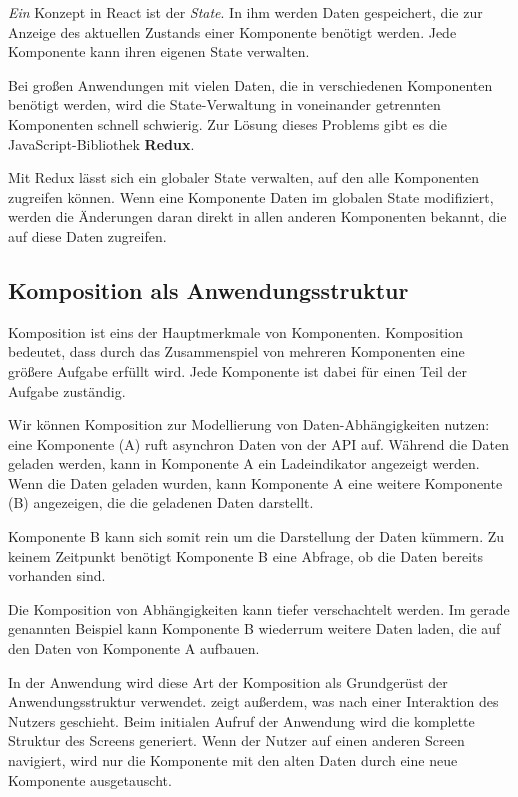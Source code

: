 \emph{Ein} Konzept in React ist der \emph{State}. In ihm werden Daten gespeichert, die zur Anzeige des aktuellen Zustands einer Komponente benötigt werden. Jede Komponente kann ihren eigenen State verwalten. \citep[State and Lifecycle]{ReactDocs}

Bei großen Anwendungen mit vielen Daten, die in verschiedenen Komponenten benötigt werden, wird die State-Verwaltung in voneinander getrennten Komponenten schnell schwierig. Zur Lösung dieses Problems gibt es die JavaScript-Bibliothek \textbf{Redux}.

Mit Redux lässt sich ein globaler State verwalten, auf den alle Komponenten zugreifen können. Wenn eine Komponente Daten im globalen State modifiziert, werden die Änderungen daran direkt in allen anderen Komponenten bekannt, die auf diese Daten zugreifen.

\subsection{Komposition als An\-wen\-dungs\-struk\-tur}
\label{subsec:komposition}

Komposition ist eins der Hauptmerkmale von Komponenten. Komposition bedeutet, dass durch das Zusammenspiel von mehreren Komponenten eine größere Aufgabe erfüllt wird. Jede Komponente ist dabei für einen Teil der Aufgabe zuständig. \citep[Kapitel 1]{Maemecke2017}

Wir können Komposition zur Modellierung von Daten-Abhängigkeiten nutzen: eine Komponente (A) ruft asynchron Daten von der \ac{API} auf. Während die Daten geladen werden, kann in Komponente A ein Ladeindikator angezeigt werden. Wenn die Daten geladen wurden, kann Komponente A eine weitere Komponente (B) angezeigen, die die geladenen Daten darstellt.

Komponente B kann sich somit rein um die Darstellung der Daten kümmern. Zu keinem Zeitpunkt benötigt Komponente B eine Abfrage, ob die Daten bereits vorhanden sind.

Die Komposition von Abhängigkeiten kann tiefer verschachtelt werden. Im gerade genannten Beispiel kann Komponente B wiederrum weitere Daten laden, die auf den Daten von Komponente A aufbauen.

In der Anwendung wird diese Art der Komposition als Grundgerüst der Anwendungsstruktur verwendet.  zeigt außerdem, was nach einer Interaktion des Nutzers geschieht. Beim initialen Aufruf der Anwendung wird die komplette Struktur des Screens generiert. Wenn der Nutzer auf einen anderen Screen navigiert, wird nur die Komponente mit den alten Daten durch eine neue Komponente ausgetauscht.

